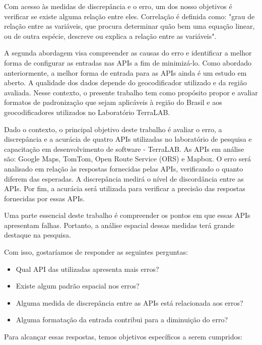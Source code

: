 Com acesso às medidas de discrepância e o erro, um dos nosso objetivos é verificar se existe alguma relação entre eles. Correlação é definida como: "grau de relação entre as variáveis, que procura determinar quão bem uma equação linear, ou de outra espécie, descreve ou explica a relação entre as variáveis"\cite{spiegel2009}.

A segunda abordagem visa compreender as causas do erro e identificar a melhor forma de configurar as entradas nas APIs a fim de minimizá-lo. Como abordado anteriormente, a melhor forma de entrada para as APIs ainda é um estudo em aberto. A qualidade dos dados depende do geocodificador utilizado e da região avaliada. Nesse contexto, o presente trabalho tem como propósito propor e avaliar formatos de padronização que sejam aplicáveis à região do Brasil e aos geocodificadores utilizados no Laboratório TerraLAB.

Dado o contexto, o principal objetivo deste trabalho é avaliar o erro, a discrepância e a acurácia de quatro APIs utilizadas no laboratório de pesquisa e capacitação em desenvolvimento de software - TerraLAB. As APIs em análise são: Google Maps, TomTom, Open Route Service (ORS) e Mapbox. O erro será analisado em relação às respostas fornecidas pelas APIs, verificando o quanto diferem das esperadas. A discrepância medirá o nível de discordância entre as APIs. Por fim, a acurácia será utilizada para verificar a precisão das respostas fornecidas por essas APIs.
    
Uma parte essencial deste trabalho é compreender os pontos em que essas APIs apresentam falhas. Portanto, a análise espacial dessas medidas terá grande destaque na pesquisa.

Com isso, gostaríamos de responder as seguintes perguntas:
\begin{itemize}
   \item Qual API das utilizadas apresenta mais erros?
   \item Existe algum padrão espacial nos erros?
   \item Alguma medida de discrepância entre as APIs está relacionada aos erros?
   \item Alguma formatação da entrada contribui para a diminuição do erro?
\end{itemize}

Para alcançar essas respostas, temos objetivos específicos a serem cumpridos:

